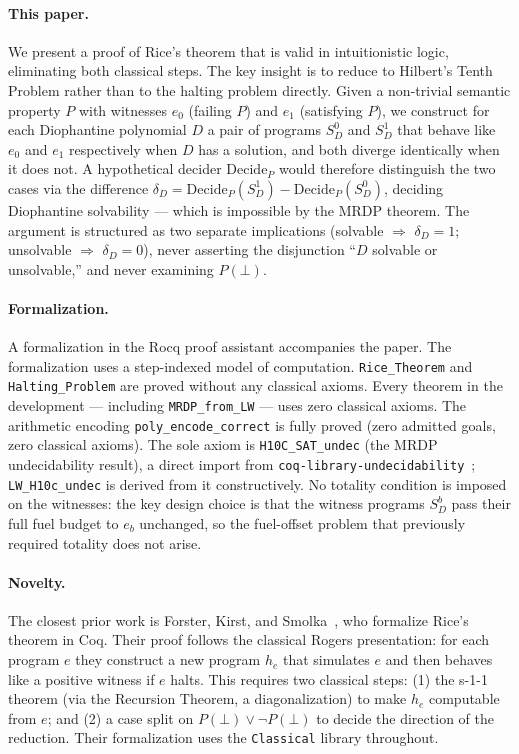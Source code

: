 \documentclass{lmcs}
\begin{document}
\paragraph{This paper.}
We present a proof of Rice's theorem that is valid in intuitionistic logic,
eliminating both classical steps. The key insight is to reduce to Hilbert's
Tenth Problem rather than to the halting problem directly. Given a
non-trivial semantic property $P$ with witnesses $e_0$ (failing $P$) and
$e_1$ (satisfying $P$), we construct for each Diophantine polynomial $D$ a
pair of programs $S_D^0$ and $S_D^1$ that behave like $e_0$ and $e_1$
respectively when $D$ has a solution, and both diverge identically when it
does not. A hypothetical decider $\mathrm{Decide}_P$ would therefore
distinguish the two cases via the difference $\delta_D =
\mathrm{Decide}_P(S_D^1) - \mathrm{Decide}_P(S_D^0)$, deciding Diophantine
solvability --- which is impossible by the MRDP theorem. The argument is
structured as two separate implications (solvable $\Rightarrow$ $\delta_D =
1$; unsolvable $\Rightarrow$ $\delta_D = 0$), never asserting the
disjunction ``$D$ solvable or unsolvable,'' and never examining $P(\bot)$.

\paragraph{Formalization.}
A formalization in the Rocq proof assistant accompanies the paper. The
formalization uses a step-indexed model of computation. \texttt{Rice\_Theorem}
and \texttt{Halting\_Problem} are proved without any classical axioms.
Every theorem in the development --- including \texttt{MRDP\_from\_LW} ---
uses zero classical axioms. The arithmetic encoding \texttt{poly\_encode\_correct}
is fully proved (zero admitted goals, zero classical axioms). The sole axiom is
\texttt{H10C\_SAT\_undec} (the MRDP undecidability result), a direct import
from \texttt{coq-library-undecidability}~\cite{larchey2022};
\texttt{LW\_H10c\_undec} is derived from it constructively.
No totality condition is imposed on the witnesses: the key design choice
is that the witness programs $S_D^b$ pass their full fuel budget to $e_b$
unchanged, so the fuel-offset problem that previously required totality
does not arise.

\paragraph{Novelty.}
The closest prior work is Forster, Kirst, and Smolka~\cite{forster2019},
who formalize Rice's theorem in Coq. Their proof follows the classical
Rogers presentation: for each program $e$ they construct a new program $h_e$
that simulates $e$ and then behaves like a positive witness if $e$ halts.
This requires two classical steps: (1) the s-1-1 theorem (via the Recursion
Theorem, a diagonalization) to make $h_e$ computable from $e$; and (2) a
case split on $P(\bot) \vee \neg P(\bot)$ to decide the direction of the
reduction. Their formalization uses the \texttt{Classical} library
throughout.
\end{document}
